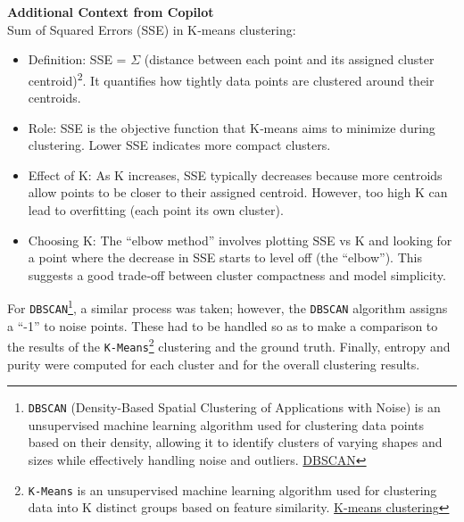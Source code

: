 \begin{framed}
\textbf{Additional Context from Copilot}\\
Sum of Squared Errors (SSE) in K‑means clustering:

\begin{itemize}
\item Definition: SSE = $\Sigma$ (distance between each point and its assigned cluster centroid)\textsuperscript{2}. It quantifies how tightly data points are clustered around their centroids.
\item Role: SSE is the objective function that K‑means aims to minimize during clustering. Lower SSE indicates more compact clusters.
\item Effect of K: As K increases, SSE typically decreases because more centroids allow points to be closer to their assigned centroid. However, too high K can lead to overfitting (each point its own cluster).
\item Choosing K: The ``elbow method'' involves plotting SSE vs K and looking for a point where the decrease in SSE starts to level off (the ``elbow''). This suggests a good trade‑off between cluster compactness and model simplicity.
\end{itemize}
\end{framed}

For \texttt{DBSCAN}\footnote{\texttt{DBSCAN} (Density-Based Spatial Clustering of Applications with Noise) is an unsupervised machine learning algorithm used for clustering data points based on their density, allowing it to identify clusters of varying shapes and sizes while effectively handling noise and outliers. \href{https://en.wikipedia.org/wiki/DBSCAN}{DBSCAN}}, a similar process was taken; however, the \texttt{DBSCAN} algorithm assigns a ``-1'' to noise points.  These had to be handled so as to make a comparison to the results of the \texttt{K-Means}\footnote{\texttt{K-Means} is an unsupervised machine learning algorithm used for clustering data into K distinct groups based on feature similarity. \href{https://en.wikipedia.org/wiki/K-means\_clustering}{K-means clustering}} clustering and the ground truth.  Finally, entropy and purity were computed for each cluster and for the overall clustering results.

